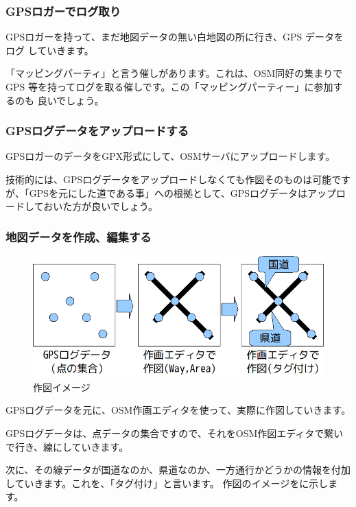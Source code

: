 \documentclass[mingoth,a4paper]{jsarticle}
\begin{document}
\subsubsection{GPSロガーでログ取り}

GPSロガーを持って、まだ地図データの無い白地図の所に行き、GPS データをログ
していきます。

「マッピングパーティ」と言う催しがあります。これは、OSM同好の集まりでGPS
等を持ってログを取る催しです。この「マッピングパーティー」に参加するのも
良いでしょう。

\subsubsection{GPSログデータをアップロードする}

GPSロガーのデータをGPX形式にして、OSMサーバにアップロードします。

技術的には、GPSログデータをアップロードしなくても作図そのものは可能ですが、「GPSを元にした道である事」への根拠として、GPSログデータはアップロードしておいた方が良いでしょう。

\subsubsection{地図データを作成、編集する}

\begin{figure}[h]
 \centering
 \includegraphics[scale=0.7]{image200912/debianosm5.png}
 \caption{作図イメージ}
 \label{fig:debianosm5}
\end{figure}

GPSログデータを元に、OSM作画エディタを使って、実際に作図していきます。

GPSログデータは、点データの集合ですので、それをOSM作図エディタで繋いで行き、線にしていきます。

次に、その線データが国道なのか、県道なのか、一方通行かどうかの情報を付加していきます。これを、「タグ付け」と言います。
作図のイメージをに示します。
\end{document}
